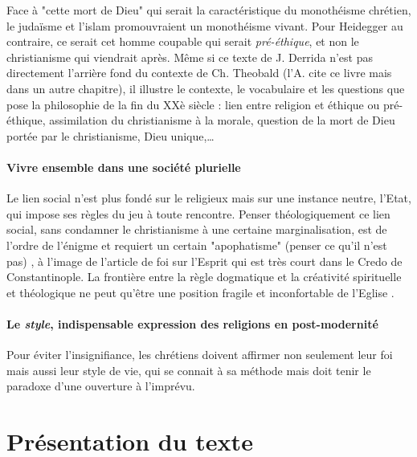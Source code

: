 Face à "cette mort de Dieu" qui serait la caractéristique du monothéisme chrétien, le judaïsme et l'islam promouvraient un monothéisme vivant. Pour Heidegger au contraire, ce serait cet homme coupable qui serait \textit{pré-éthique}, et non le christianisme qui viendrait après. Même si ce texte de J. Derrida n'est pas directement l'arrière fond du contexte de Ch. Theobald (l'A. cite ce livre mais dans un autre chapitre), il illustre le contexte, le vocabulaire et les questions que pose la philosophie  de la fin du XXè siècle : lien entre religion et éthique ou pré-éthique, assimilation du christianisme à la morale, question de la mort de Dieu portée par le christianisme, Dieu unique,\ldots  

 



\paragraph{Vivre ensemble dans une société plurielle} Le lien social n'est plus fondé sur le religieux mais sur une instance neutre, l'Etat, qui impose ses règles du jeu à toute rencontre. Penser théologiquement ce lien social, sans condamner le christianisme à une certaine marginalisation, est de l'ordre de l'énigme et requiert un certain "apophatisme" (penser ce qu'il n'est pas) \cite[p. 771]{theobald_christianisme_2007}, à l'image de l'article de foi sur l'Esprit qui est très court dans le Credo de Constantinople. La frontière entre la règle dogmatique et la créativité spirituelle et théologique ne peut qu'être une position fragile et inconfortable de l'Eglise \cite[p. 777]{theobald_christianisme_2007}.

\begin{comment}
    si on a le temps, lire Esprit 2004:17
\end{comment}
 
\paragraph{Le \textit{style}, indispensable expression des religions en post-modernité}  Pour éviter l'insignifiance, les chrétiens doivent affirmer non seulement leur foi mais aussi leur style de vie, qui se connait à sa méthode mais doit tenir le paradoxe d'une ouverture à l'imprévu.  \cite[p.10]{theobald_christianisme_2007} 


\section{Présentation du texte}

